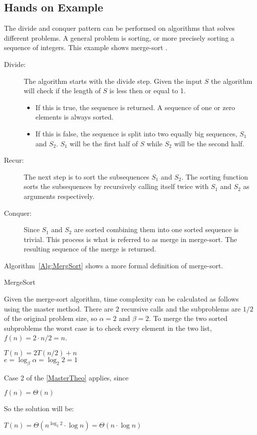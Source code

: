 \subsection{Hands on Example}
The divide and conquer pattern can be performed on algorithms that solves
different problems. A general problem is sorting, or more precisely sorting a
sequence of integers. This example shows merge-sort \cite{Goodrich}.

\begin{description}
\item[Divide:] The algorithm starts with the divide step. Given the input $S$
the algorithm will check if the length of $S$ is less then or equal to 1.
\begin{itemize}
\item If this is true, the sequence is returned. A sequence of one or zero
elements is always sorted.
\item If this is false, the sequence is split into two equally big sequences,
$S_1$ and $S_2$. $S_1$ will be the first half of $S$ while $S_2$ will be the
second half.
\end{itemize}
\item[Recur:] The next step is to sort the subsequences $S_1$ and $S_2$. The
sorting function sorts the subsequences by recursively calling itself twice with
$S_1$ and $S_2$ as arguments respectively.
\item[Conquer:] Since $S_1$ and $S_2$ are sorted combining them into one sorted
sequence is trivial. This process is what is referred to as merge in merge-sort.
The resulting sequence of the merge is returned.
\end{description}
Algorithm~\ref{Alg:MergSort} shows a more formal definition of merge-sort.

\begin{algorithm}
\DontPrintSemicolon
{}
\caption{MergeSort}
\label{Alg:MergSort}
\end{algorithm}

Given the merge-sort algorithm, time complexity can be calculated as follows
using the master method. There are $2$ recursive calls and the subproblems are
$1/2$ of the original problem size, so $\alpha=2$ and $\beta=2$. To merge the
two sorted subproblems the worst case is to check every element in the two list,
$f(n) = 2 \cdot n/2 = n$.
\begin{center}
$T(n) = 2T(n/2) + n$\\
$e=\log_\beta\alpha=\log_2 2=1$
\end{center}
\newpage
Case 2 of the \cref{MasterTheo} applies, since
\begin{center}
$f(n) = \Theta(n)$
\end{center}
So the solution will be:
\begin{center}
$T(n) = \Theta(n^{\log_2 2} \cdot \log n) = \Theta(n \cdot \log n)$
\end{center}

